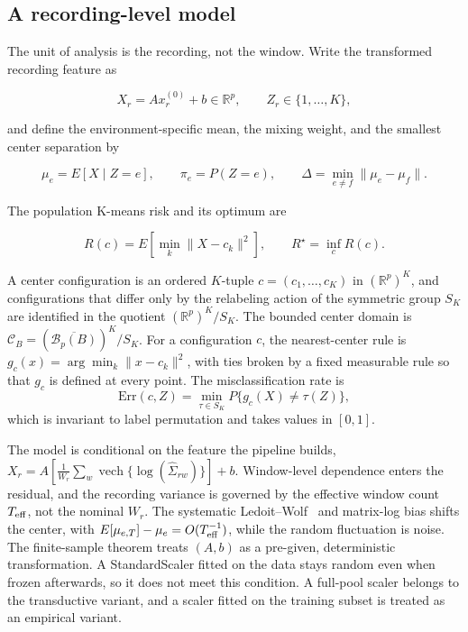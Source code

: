 \subsection{A recording-level model}\label{a-recording-level-model}

The unit of analysis is the recording, not the window. Write the
transformed recording feature as

\[X_r = A x_r^{(0)} + b \in \mathbb R^p,\qquad Z_r\in\{1,\dots,K\},\]

and define the environment-specific mean, the mixing weight, and the
smallest center separation by

\[\mu_e = E[X\mid Z=e],\qquad \pi_e=P(Z=e),\qquad
\Delta=\min_{e\ne f}\|\mu_e-\mu_f\|.\]

The population K-means risk and its optimum are

\begin{equation}\label{eq:risk}
R(c)=E\!\left[\min_k\|X-c_k\|^2\right],\qquad R^\star=\inf_c R(c).
\end{equation}

\begin{definition}\label{def:err}
A center configuration is an ordered $K$-tuple $c=(c_1,\dots,c_K)$ in $(\mathbb R^p)^K$, and configurations that differ only by the relabeling action of the symmetric group $S_K$ are identified in the quotient $(\mathbb R^p)^K/S_K$. The bounded center domain is $\mathcal C_B=(\overline{\mathcal B_p(B)})^K/S_K$. For a configuration $c$, the nearest-center rule is $g_c(x)=\arg\min_k\|x-c_k\|^2$, with ties broken by a fixed measurable rule so that $g_c$ is defined at every point. The misclassification rate is
$$\mathrm{Err}(c,Z)=\min_{\tau\in S_K}P\{g_c(X)\ne\tau(Z)\},$$
which is invariant to label permutation and takes values in $[0,1]$.
\end{definition}

The model is conditional on the feature the pipeline builds,
\(X_r=A[\frac1{W_r}\sum_w\operatorname{vech}\{\log(\widehat\Sigma_{rw})\}]+b\).
Window-level dependence enters the residual, and the recording variance
is governed by the effective window count \(T_{\rm eff}\), not the
nominal \(W_r\). The systematic
Ledoit--Wolf~\cite{ledoit2004} and matrix-log bias
shifts the center, with \(E[\mu_{e,T}]-\mu_e=O(T_{\rm eff}^{-1})\),
while the random fluctuation is noise. The finite-sample theorem treats
\((A,b)\) as a pre-given, deterministic transformation. A StandardScaler
fitted on the data stays random even when frozen afterwards, so it does
not meet this condition. A full-pool scaler belongs to the transductive
variant, and a scaler fitted on the training subset is treated as an
empirical variant.

